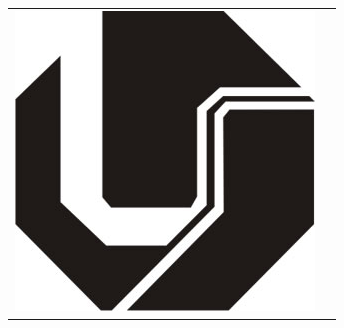 \documentclass[xcolor=dvipsnames,10pt,aspectratio=169]{beamer}
\begin{document}
\begin{frame}
\begin{center}
\begin{tabular}{c c}
{				\includegraphics[trim=0.0cm 0.0cm 0.0cm 0.0cm,clip=true,height=0.2\textheight]{figuras_presentation_template/UFU_black.jpg}
			}
		\end{tabular}
		\end{center}
			
	\end{frame}
		
			
		
		
		
\end{document}
